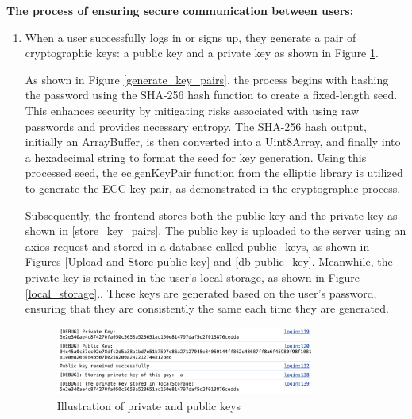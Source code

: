 \documentclass[12pt]{article}
\begin{document}
        \textbf{The process of ensuring secure communication between users:}
        \begin{enumerate}
            \item When a user successfully logs in or signs up, they generate a pair of cryptographic keys: a public key and a private key as shown in Figure \ref{show_keys}.

            As shown in Figure \ref{generate_key_pairs}, the process begins with hashing the password using the SHA-256 hash function to create a fixed-length seed. This enhances security by mitigating risks associated with using raw passwords and provides necessary entropy. The SHA-256 hash output, initially an ArrayBuffer, is then converted into a Uint8Array, and finally into a hexadecimal string to format the seed for key generation. Using this processed seed, the ec.genKeyPair function from the elliptic library is utilized to generate the ECC key pair, as demonstrated in the cryptographic process.

            Subsequently, the frontend stores both the public key and the private key as shown in \ref{store_key_pairs}. The public key is uploaded to the server using an axios request and stored in a database called public\_keys, as shown in Figures \ref{Upload and Store public key} and \ref{db public_key}. Meanwhile, the private key is retained in the user's local storage, as shown in Figure \ref{local_storage}.. These keys are generated based on the user's password, ensuring that they are consistently the same each time they are generated.

            \begin{figure}[H]
                \centering
                \includegraphics[width=0.8\textwidth]{graphs/show_keys.jpg}
                \caption{Illustration of private and public keys}
                \label{show_keys}
            \end{figure}


\end{enumerate}
\end{document}
